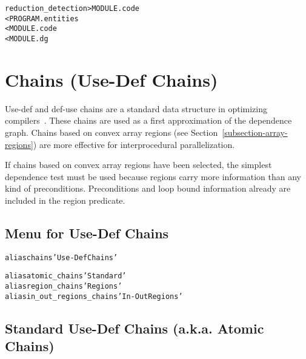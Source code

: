 \documentclass[a4paper]{report}
\newenvironment{PipsMake}{\begin{alltt}}{\end{alltt}}
\newenvironment{PipsPass}[1]{\label{pass:#1}}{}
\begin{document}
\begin{PipsMake}
reduction_detection > MODULE.code
  < PROGRAM.entities
  < MODULE.code
  < MODULE.dg
\end{PipsMake}

\section{Chains (Use-Def Chains)}
\label{subsection-chains}

\begin{PipsPass}{chains}
Use-def and def-use chains are a standard data structure in optimizing
compilers~\cite{ASU86}. These chains are used as a first approximation of
the dependence graph. Chains based on convex array regions (see
Section~\ref{subsection-array-regions}) are more effective for
interprocedural parallelization.

If chains based on convex array regions have been selected, the simplest dependence
test must be used because regions carry more information than any kind
of preconditions. Preconditions and loop bound information already are
included in the region predicate.
\end{PipsPass}

\subsection{Menu for Use-Def Chains}

\begin{PipsMake}
alias chains 'Use-Def Chains'

alias atomic_chains 'Standard'
alias region_chains 'Regions'
alias in_out_regions_chains 'In-Out Regions'
\end{PipsMake}

\subsection{Standard Use-Def Chains (a.k.a. Atomic Chains)}
\label{subsubsection-atomic-chains}
\end{document}
